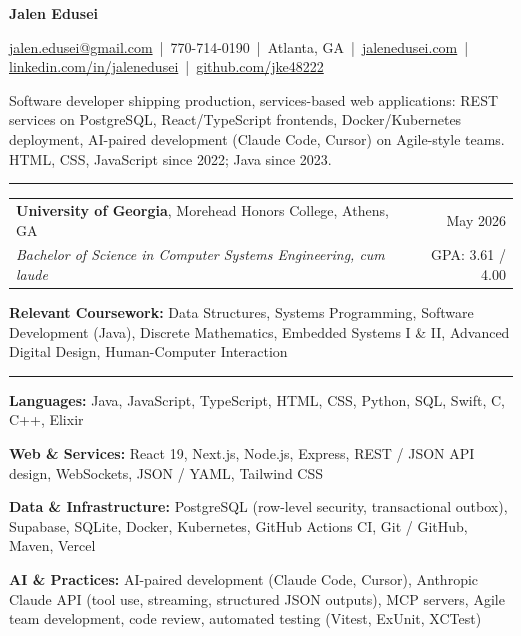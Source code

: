 \documentclass[letterpaper,10pt]{article}
\newcommand{\sectiontitle}[1]{\vspace{4pt}{\textbf{\large #1}}\par\vspace{-6pt}\rule{\textwidth}{0.4pt}\par\vspace{1pt}}
\begin{document}
\begin{center}
{\LARGE \textbf{Jalen Edusei}}\par
\vspace{2pt}
{\small \href{mailto:jalen.edusei@gmail.com}{jalen.edusei@gmail.com} \,|\,
770-714-0190 \,|\,
Atlanta, GA \,|\,
\href{https://www.jalenedusei.com}{jalenedusei.com} \,|\,
\href{https://www.linkedin.com/in/jalenedusei}{linkedin.com/in/jalenedusei} \,|\,
\href{https://github.com/jke48222}{github.com/jke48222}}
\end{center}

\vspace{3pt}
{\small Software developer shipping production, services-based web applications: REST services on PostgreSQL, React/TypeScript frontends, Docker/Kubernetes deployment, AI-paired development (Claude Code, Cursor) on Agile-style teams. HTML, CSS, JavaScript since 2022; Java since 2023.}\par

\sectiontitle{EDUCATION}
\begin{tabularx}{\textwidth}{@{}X r@{}}
\textbf{University of Georgia}, Morehead Honors College, Athens, GA & May 2026 \\
\textit{Bachelor of Science in Computer Systems Engineering, cum laude} & GPA: 3.61 / 4.00 \\
\end{tabularx}
\vspace{1pt}\par
{\small \textbf{Relevant Coursework:} Data Structures, Systems Programming, Software Development (Java), Discrete Mathematics, Embedded Systems I \& II, Advanced Digital Design, Human-Computer Interaction}

\sectiontitle{TECHNICAL SKILLS}
\textbf{Languages:} Java, JavaScript, TypeScript, HTML, CSS, Python, SQL, Swift, C, C++, Elixir\par
\textbf{Web \& Services:} React 19, Next.js, Node.js, Express, REST / JSON API design, WebSockets, JSON / YAML, Tailwind CSS\par
\textbf{Data \& Infrastructure:} PostgreSQL (row-level security, transactional outbox), Supabase, SQLite, Docker, Kubernetes, GitHub Actions CI, Git / GitHub, Maven, Vercel\par
\textbf{AI \& Practices:} AI-paired development (Claude Code, Cursor), Anthropic Claude API (tool use, streaming, structured JSON outputs), MCP servers, Agile team development, code review, automated testing (Vitest, ExUnit, XCTest)
\end{document}
